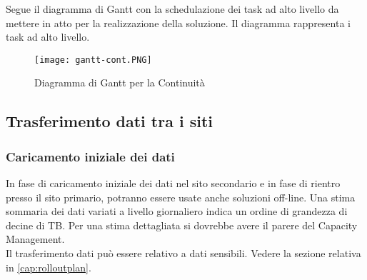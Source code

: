 Segue il diagramma di Gantt con la schedulazione dei task ad alto livello da mettere in atto per la realizzazione della soluzione. Il diagramma rappresenta i task ad alto livello.

\begin{figure}[H]
\centering
\texttt{[image: gantt-cont.PNG]}
\caption{Diagramma di Gantt per la Continuità}
\end{figure}

\subsection{Trasferimento dati tra i siti}
\subsubsection{Caricamento iniziale dei dati}
In fase di caricamento iniziale dei dati nel sito secondario e in fase di rientro presso il sito primario, potranno essere usate anche soluzioni off-line. Una stima sommaria dei dati variati a livello giornaliero indica un ordine di grandezza di decine di TB. Per una stima dettagliata si dovrebbe avere il parere del Capacity Management.
\\Il trasferimento dati può essere relativo a dati sensibili. Vedere la sezione relativa in \ref{cap:rolloutplan}.
